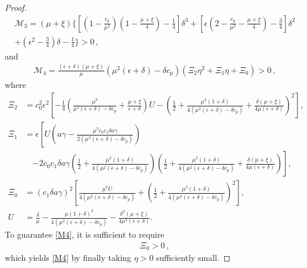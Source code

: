 \documentclass[reqno,11pt]{amsart}
\numberwithin{equation}{section}
\begin{document}
\begin{proof}
\begin{equation}\label{M3}
  \begin{aligned}
    \mathcal{M}_3 = (\mu + \xi) \Big\{ [ (1 - \frac{c_p}{\mu^2}) ( 1 - \frac{\mu + \xi}{4} ) - \frac{1}{4} ] \delta^3 + [ \epsilon ( 2 - \frac{c_p}{\mu^2} - \frac{\mu + \xi}{4} ) - \frac{3}{4} ] \delta^2 \\
    + (\epsilon^2 - \frac{3}{4}) \delta - \frac{1}{4} \Big\} > 0 \,,
  \end{aligned}
\end{equation}
and
\begin{equation}\label{M4}
  \begin{aligned}
    \mathcal{M}_4 = \frac{(\epsilon + \delta) ( \mu + \xi )}{\mu} ( \mu^2 (\epsilon + \delta) - \delta c_p ) ( \Xi_2 \eta^2 + \Xi_1 \eta + \Xi_0 ) > 0 \,,
  \end{aligned}
\end{equation}
where
  \begin{align*}
    \Xi_{2} &= c_{0}^{2}\epsilon^{2}\left[-\frac{1}{4}\left(\frac{\mu^{3}}{\mu^{2}(\epsilon+\delta)-\delta c_{p}}+\frac{\mu+\xi}{\epsilon+\delta}\right) U-\left(\frac{1}{2}+\frac{\mu^{2}(1+\delta)}{4\left(\mu^{2}(\epsilon+\delta)-\delta c_{p}\right)}+\frac{\delta(\mu+\xi)}{4\mu(\epsilon+\delta)}\right)^{2}\right], \\
    \Xi_{1} &= \epsilon\left[U\left(a\gamma-\frac{\mu^{3} c_{0}c_{1}\delta a\gamma}{2\left(\mu^{2}(\epsilon+\delta)-\delta c_{p}\right)}\right) \right. \\
    & \quad \left.-2 c_{0}c_{1}\delta a\gamma\left(\frac{1}{2}+\frac{\mu^{2}(1+\delta)}{4\left(\mu^{2}(\epsilon+\delta)-\delta c_{p}\right)}\right)\left(\frac{1}{2}+\frac{\mu^{2}(1+\delta)}{4\left(\mu^{2}(\epsilon+\delta)-\delta c_{p}\right)}+\frac{\delta(\mu+\xi)}{4\mu(\epsilon+\delta)}\right)\right], \\
    \Xi_{0} &=  \left(c_{1}\delta a\gamma\right)^{2}\left[\frac{\mu^{3} U}{4\left(\mu^{2}(\epsilon+\delta)-\delta c_{p}\right)}+\left(\frac{1}{2}+\frac{\mu^{2}(1+\delta)}{4\left(\mu^{2}(\epsilon+\delta)-\delta c_{p}\right)}\right)^{2}\right], \\
    U &= \frac{\delta}{\mu}-\frac{\mu(1+\delta)^{2}}{4\left(\mu^{2}(\epsilon+\delta)-\delta c_{p}\right)}-\frac{\delta^{2}(\mu+\xi)}{4\mu^{2}(\epsilon+\delta)}.
  \end{align*}
  To guarantee \eqref{M4}, it is sufficient to require
  \begin{equation}\label{Xi0}
    \begin{aligned}
      \Xi_0 > 0 \,,
    \end{aligned}
  \end{equation}
  which yields \eqref{M4} by finally taking $\eta > 0$ sufficiently small.


\end{proof}
\end{document}
